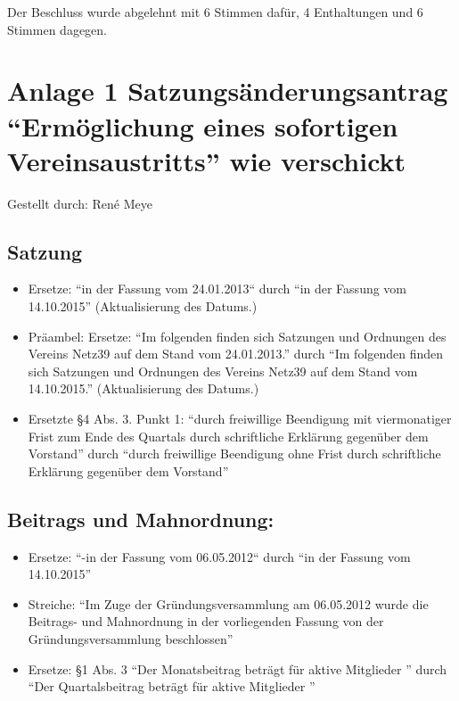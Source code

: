\documentclass[a4paper,12pt,titlepage]{scrartcl}
\begin{document}
Der Beschluss wurde abgelehnt mit 6 Stimmen dafür, 4 Enthaltungen und 6 Stimmen dagegen.

\newpage

\section*{Anlage 1 Satzungsänderungsantrag “Ermöglichung eines sofortigen Vereinsaustritts” wie verschickt}

Gestellt durch: René Meye

\subsection*{Satzung}
\begin{itemize}
	\item Ersetze: “in der Fassung vom 24.01.2013“ durch “in der Fassung vom 14.10.2015” (Aktualisierung des Datums.)
	\item Präambel: Ersetze: “Im folgenden finden sich Satzungen und Ordnungen des Vereins Netz39 auf dem Stand vom 24.01.2013.” durch “Im folgenden finden sich Satzungen und Ordnungen des Vereins Netz39 auf dem Stand vom 14.10.2015.” (Aktualisierung des Datums.)
	\item Ersetzte §4 Abs. 3. Punkt 1: “durch freiwillige Beendigung mit viermonatiger Frist zum Ende des Quartals durch schriftliche Erklärung gegenüber dem Vorstand” durch “durch freiwillige Beendigung ohne Frist durch schriftliche Erklärung gegenüber dem Vorstand”
\end{itemize}

\subsection*{Beitrags und Mahnordnung:}
\begin{itemize}
	\item Ersetze: “-in der Fassung vom 06.05.2012“ durch “in der Fassung vom 14.10.2015”
	\item Streiche: “Im Zuge der Gründungsversammlung am 06.05.2012 wurde die Beitrags- und Mahnordnung in der vorliegenden Fassung von der Gründungsversammlung beschlossen”
	\item Ersetze: §1 Abs. 3 “Der Monatsbeitrag beträgt für aktive Mitglieder ” durch “Der Quartalsbeitrag beträgt für aktive Mitglieder ”
\end{itemize}
\end{document}
